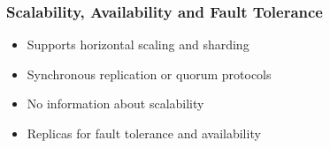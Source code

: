 
\begin{frame}
\frametitle{Scalability, Availability and Fault Tolerance}
\begin{itemize}
\item %
Supports horizontal scaling and sharding

\item %
Synchronous replication or quorum protocols
\item %
No information about scalability 
\item %
Replicas for fault tolerance and availability
\end{itemize}
\end{frame} 